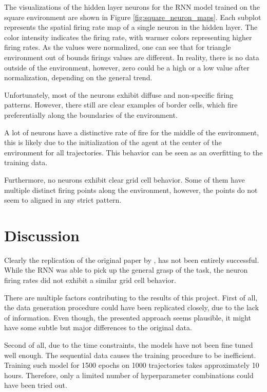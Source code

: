 \documentclass{article}
\begin{document}
The visualizations of the hidden layer neurons for the RNN model trained on the square environment are shown in Figure \ref{fig:square_neuron_maps}. Each subplot represents the spatial firing rate map of a single neuron in the hidden layer. The color intensity indicates the firing rate, with warmer colors representing higher firing rates. As the values were normalized, one can see that for triangle environment out of bounds firings values are different. In reality, there is no data outside of the environment, however, zero could be a high or a low value after normalization, depending on the general trend.  

Unfortunately, most of the neurons exhibit diffuse and non-specific firing patterns. However, there still are clear examples of border cells, which fire preferentially along the boundaries of the environment. 

A lot of neurons have a distinctive rate of fire for the middle of the environment, this is likely due to the initialization of the agent at the center of the environment for all trajectories. This behavior can be seen as an overfitting to the training data.

Furthermore, no neurons exhibit clear grid cell behavior. Some of them have multiple distinct firing points along the environment, however, the points do not seem to aligned in any strict pattern.


\section{Discussion}
Clearly the replication of the original paper by \citep{chaplot2018active}, has not been entirely successful. While the RNN was able to pick up the general grasp of the task, the neuron firing rates did not exhibit a similar grid cell behavior. 

There are multiple factors contributing to the results of this project. First of all, the data generation procedure could have been replicated closely, due to the lack of information. Even though, the presented approach seems plausible, it might have some subtle but major differences to the original data. 

Second of all, due to the time constraints, the models have not been fine tuned well enough. The sequential data causes the training procedure to be inefficient. Training such model for 1500 epochs on 1000 trajectories takes approximately 10 hours. Therefore, only a limited number of hyperparameter combinations could have been tried out.
\end{document}
